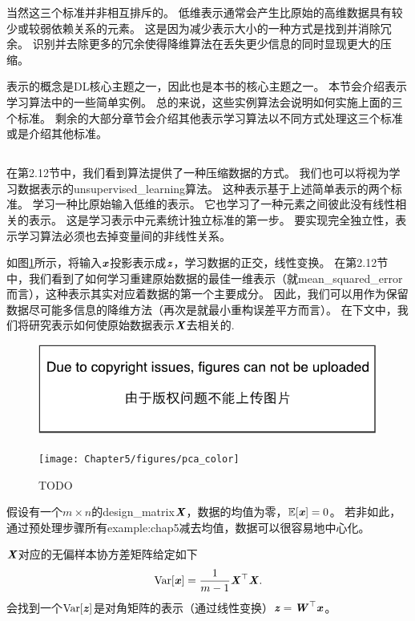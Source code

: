 当然这三个标准并非相互排斥的。
低维表示通常会产生比原始的高维数据具有较少或较弱依赖关系的元素。
这是因为减少表示大小的一种方式是找到并消除冗余。
识别并去除更多的冗余使得降维算法在丢失更少信息的同时显现更大的压缩。

表示的概念是\gls{DL}核心主题之一，因此也是本书的核心主题之一。
本节会介绍表示学习算法中的一些简单实例。
总的来说，这些实例算法会说明如何实施上面的三个标准。
剩余的大部分章节会介绍其他表示学习算法以不同方式处理这三个标准或是介绍其他标准。

\subsection{}
\label{sec:principal_components_analysis_chap5}
在第2.12节中，我们看到算法提供了一种压缩数据的方式。
我们也可以将视为学习数据表示的\gls{unsupervised_learning}算法。
这种表示基于上述简单表示的两个标准。
学习一种比原始输入低维的表示。
它也学习了一种元素之间彼此没有线性相关的表示。
这是学习表示中元素统计独立标准的第一步。
要实现完全独立性，表示学习算法必须也去掉变量间的非线性关系。


如图\ref{fig:chap5_pca}所示，将输入$\boldsymbol{\mathit{x}}$投影表示成$\boldsymbol{\mathit{z}}$，学习数据的正交，线性变换。
在第2.12节中，我们看到了如何学习重建原始数据的最佳一维表示（就\gls{mean_squared_error}而言），这种表示其实对应着数据的第一个主要成分。
因此，我们可以用作为保留数据尽可能多信息的降维方法（再次是就最小重构误差平方而言）。
在下文中，我们将研究表示如何使原始数据表示$\boldsymbol{\mathit{X}}$去相关的.

\begin{figure}[!htb]
\ifOpenSource
\centerline{\includegraphics{figure.pdf}}
\else
\centerline{\texttt{[image: Chapter5/figures/pca\_color]}}
\fi
\caption{TODO}
\label{fig:chap5_pca}
\end{figure}

假设有一个$m\times n$的\gls{design_matrix}$\boldsymbol{\mathit{X}}$，数据的均值为零，$\mathbb{E}[\boldsymbol{\mathit{x}}] = 0$。
若非如此，通过预处理步骤所有\gls{example:chap5}减去均值，数据可以很容易地中心化。

$\boldsymbol{\mathit{X}}$对应的无偏样本协方差矩阵给定如下
\begin{equation}
    \text{Var}[\boldsymbol{\mathit{x}}] = \frac{1}{m-1} \boldsymbol{\mathit{X}}^\top \boldsymbol{\mathit{X}} .
\end{equation}
会找到一个$\text{Var}[\boldsymbol{\mathit{z}}]$是对角矩阵的表示（通过线性变换）$\boldsymbol{\mathit{z}}=\boldsymbol{\mathit{W}}^\top\boldsymbol{\mathit{x}}$。

